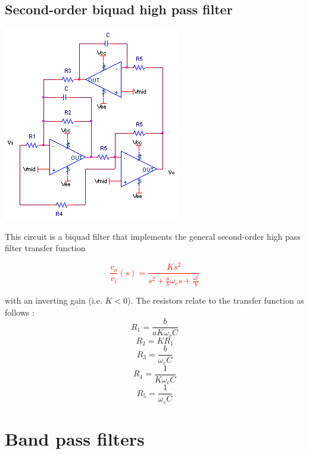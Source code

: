 \subsection{Second-order biquad high pass filter}
\begin{center}
	\includegraphics{schematics/2ndorderbiquadHPfilter.PNG}
\end{center}
This circuit is a biquad filter that implements the general second-order high pass filter transfer function

\textcolor{red}{
\begin{equation}
\frac{v_{o}}{v_{i}}(s) = \frac{Ks^{2}}{s^{2} + \frac{a}{b}\omega_{c}s + \frac{\omega_{c}^{2}}{b}}
\label{eq:2ndorderbiquadHPfilter}
\end{equation}
}

with an inverting gain (i.e. $K < 0$). The resistors relate to the transfer function as follows \autocite[131]{op-amp-circuits-johnson}:
\begin{equation}
R_1 = \frac{b}{aK\omega_{c}C}
\end{equation}
\begin{equation}
R_2 = KR_1
\end{equation}
\begin{equation}
R_3 = \frac{b}{\omega_{c}C}
\end{equation}
\begin{equation}
R_4 = \frac{1}{K\omega_{c}C}
\end{equation}
\begin{equation}
R_5 = \frac{1}{\omega_{c}C}
\end{equation}

\section{Band pass filters}


